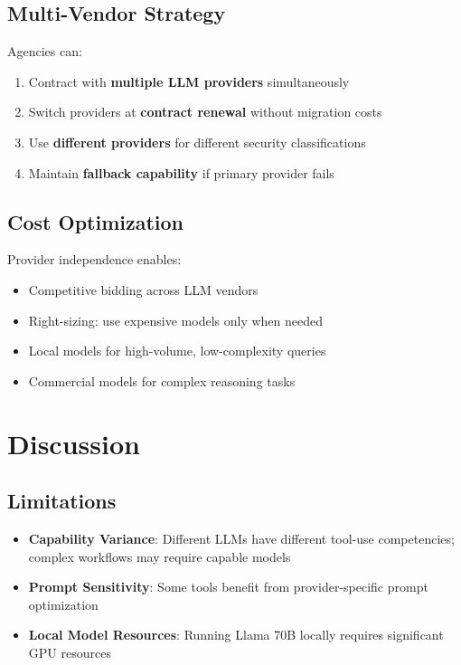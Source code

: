 \documentclass[11pt,twocolumn]{article}
\begin{document}
\subsection{Multi-Vendor Strategy}

Agencies can:

\begin{enumerate}
    \item Contract with \textbf{multiple LLM providers} simultaneously
    \item Switch providers at \textbf{contract renewal} without migration costs
    \item Use \textbf{different providers} for different security classifications
    \item Maintain \textbf{fallback capability} if primary provider fails
\end{enumerate}

\subsection{Cost Optimization}

Provider independence enables:

\begin{itemize}
    \item Competitive bidding across LLM vendors
    \item Right-sizing: use expensive models only when needed
    \item Local models for high-volume, low-complexity queries
    \item Commercial models for complex reasoning tasks
\end{itemize}

\section{Discussion}

\subsection{Limitations}

\begin{itemize}
    \item \textbf{Capability Variance}: Different LLMs have different tool-use competencies; complex workflows may require capable models
    \item \textbf{Prompt Sensitivity}: Some tools benefit from provider-specific prompt optimization
    \item \textbf{Local Model Resources}: Running Llama 70B locally requires significant GPU resources
\end{itemize}
\end{document}
